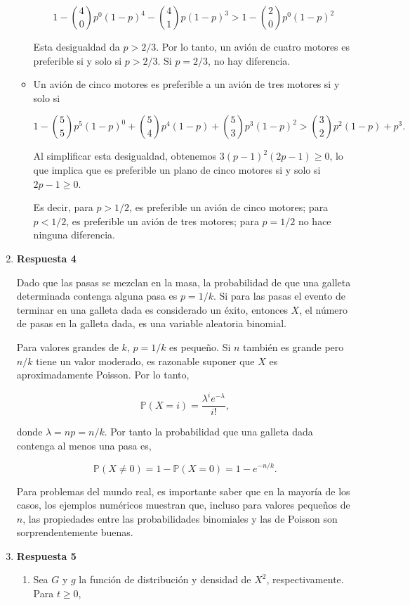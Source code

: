 \documentclass[a4paper,9pt]{report}
\begin{document}
\begin{enumerate}
\begin{itemize}
\[
1 -\binom{4}{0}p^{0}(1 - p)^{4} -\binom{4}{1}p(1 - p)^{3} > 1 -\binom{2}{0}p^{0}(1 - p)^{2}
\]

Esta desigualdad da $p> 2/3$. Por lo tanto, un avi\'on de cuatro motores es preferible si y solo si $p> 2/3$. Si $p=2/3$, no hay diferencia.

\item Un avi\'on de cinco motores es preferible a un avi\'on de tres motores si y solo si

\[
1 -\binom{5}{5}p^{5}(1 - p)^{0} + \binom{5}{4}p^{4}(1 - p) + \binom{5}{3}p^{3}(1 - p)^{2} > \binom{3}{2}p^{2}(1 - p) + p^3.
\]

Al simplificar esta desigualdad, obtenemos $3(p - 1)^{2}(2p - 1) \geq 0$, lo que implica que es preferible un plano de cinco motores si y solo si $2p - 1 \geq  0$. 

Es decir, para $p> 1/2$, es preferible un avi\'on de cinco motores; para $p <1/2$, es preferible un avi\'on de tres motores; para $p = 1/2$ no hace ninguna diferencia.
\end{itemize}

\item [] \textbf{Respuesta 4}

Dado que las pasas se mezclan en la masa, la probabilidad de que una galleta determinada contenga alguna pasa  es $p = 1/k$. Si para las pasas el evento de terminar en una galleta dada es considerado un \'exito, entonces $X$, el n\'umero de pasas en la galleta dada, es una variable aleatoria binomial. 

Para valores grandes de $k$, $p = 1/k$ es peque\~no. Si $n$ tambi\'en es grande pero $n/k$ tiene un valor moderado, es razonable suponer que $X$ es aproximadamente Poisson. Por lo tanto,

\[
\mathbb{P}(X = i) = \frac{\lambda^i e^{-\lambda}}{i!},
\]

donde $\lambda = np = n/k$. Por tanto la probabilidad que una galleta dada contenga al menos una pasa es,

\[
\mathbb{P}(X \neq 0) = 1 -\mathbb{P}(X = 0) = 1 -e^{-n/k}.
\]

Para problemas del mundo real, es importante saber que en la mayor\'ia de los casos, los ejemplos num\'ericos muestran que, incluso para valores peque\~nos de $n$, las propiedades entre las probabilidades binomiales y las de Poisson son sorprendentemente buenas.


\item [] \textbf{Respuesta 5}

\begin{enumerate}
\item Sea $G$ y $g$ la funci\'on de distribuci\'on y densidad de $X^2$, respectivamente. Para $t \geq 0$,


\end{enumerate}
\end{enumerate}
\end{document}
